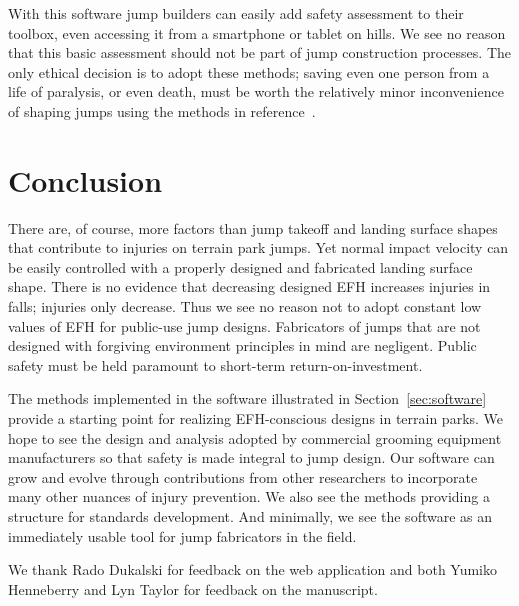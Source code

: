 \documentclass[smallextended]{svjour3}       %
\begin{document}
With this software jump builders can easily add
safety assessment to their toolbox, even accessing it from a smartphone or
tablet on hills.  We see no reason that this basic assessment should not be
part of jump construction processes. The only ethical decision is to adopt
these methods; saving even one person from a life of paralysis, or even death,
must be worth the relatively minor inconvenience of shaping jumps using the
methods in reference~\cite{Levy2015}.


\section{Conclusion}
\label{sec:conc}
%
There are, of course, more factors than jump takeoff and landing surface shapes
that contribute to injuries on terrain park jumps. Yet normal impact velocity
can be easily controlled with a properly designed and fabricated landing
surface shape. There is no evidence that decreasing designed EFH increases
injuries in falls; injuries only decrease. Thus we see no reason not to adopt
constant low values of EFH for public-use jump designs. Fabricators of jumps that are not
designed with forgiving environment principles in mind are negligent. Public safety must be held paramount to short-term
return-on-investment.

The methods implemented in the software illustrated in
Section~\ref{sec:software} provide a starting point for realizing EFH-conscious
designs in terrain parks. We hope to see the design and analysis adopted by
commercial grooming equipment manufacturers so that safety is made integral to
jump design. Our software can grow and evolve through contributions from other
researchers to incorporate many other nuances of injury prevention. We also see
the methods providing a structure for standards development. And minimally, we
see the software as an immediately usable tool for jump fabricators in the
field.

\begin{acknowledgements}
  We thank Rado Dukalski for feedback on the web application and both Yumiko
  Henneberry and Lyn Taylor for feedback on the manuscript.
\end{acknowledgements}
\end{document}
